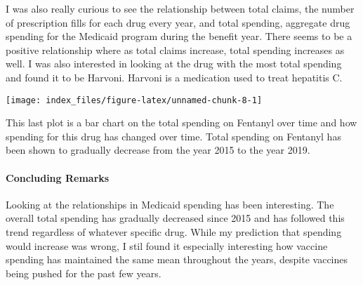 \documentclass[
]{article}
\newenvironment{Shaded}{\begin{snugshade}}{\end{snugshade}}
\newcommand{\DataTypeTok}[1]{\textcolor[rgb]{0.13,0.29,0.53}{#1}}
\newcommand{\DecValTok}[1]{\textcolor[rgb]{0.00,0.00,0.81}{#1}}
\newcommand{\FloatTok}[1]{\textcolor[rgb]{0.00,0.00,0.81}{#1}}
\newcommand{\KeywordTok}[1]{\textcolor[rgb]{0.13,0.29,0.53}{\textbf{#1}}}
\newcommand{\NormalTok}[1]{#1}
\newcommand{\OperatorTok}[1]{\textcolor[rgb]{0.81,0.36,0.00}{\textbf{#1}}}
\newcommand{\StringTok}[1]{\textcolor[rgb]{0.31,0.60,0.02}{#1}}
\begin{document}
I was also really curious to see the relationship between total claims,
the number of prescription fills for each drug every year, and total
spending, aggregate drug spending for the Medicaid program during the
benefit year. There seems to be a positive relationship where as total
claims increase, total spending increases as well. I was also interested
in looking at the drug with the most total spending and found it to be
Harvoni. Harvoni is a medication used to treat hepatitis C.

\begin{Shaded}
\end{Shaded}

\begin{center}\texttt{[image: index\_files/figure-latex/unnamed-chunk-8-1]} \end{center}

This last plot is a bar chart on the total spending on Fentanyl over
time and how spending for this drug has changed over time. Total
spending on Fentanyl has been shown to gradually decrease from the year
2015 to the year 2019.

\hypertarget{concluding-remarks}{%
\paragraph{Concluding Remarks}\label{concluding-remarks}}

Looking at the relationships in Medicaid spending has been interesting.
The overall total spending has gradually decreased since 2015 and has
followed this trend regardless of whatever specific drug. While my
prediction that spending would increase was wrong, I stil found it
especially interesting how vaccine spending has maintained the same mean
throughout the years, despite vaccines being pushed for the past few
years.
\end{document}
